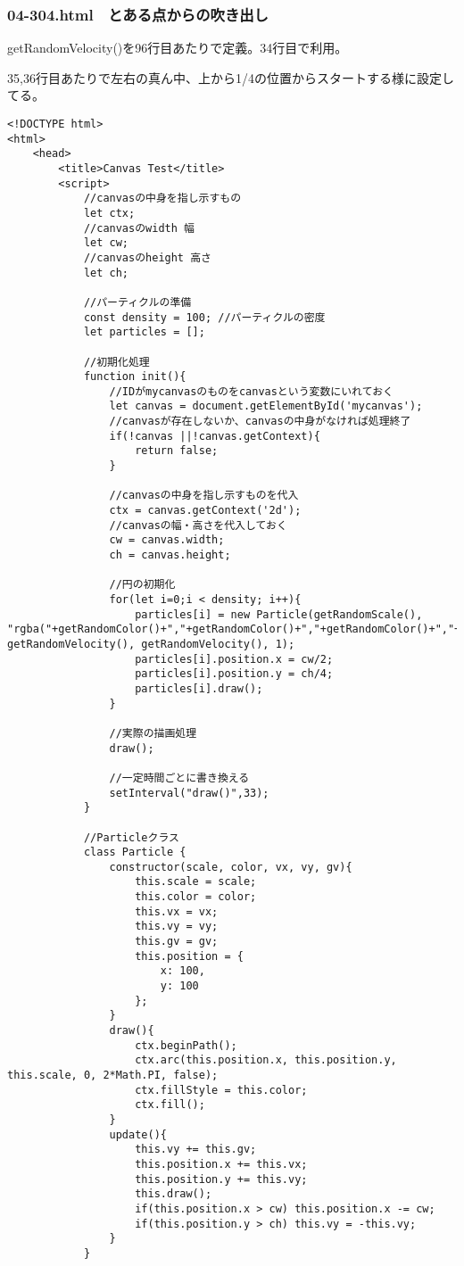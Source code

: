 \documentclass[mingoth,11pt,a4j,uplatex]{jsarticle}
\begin{document}
\subsubsection{04-304.html　とある点からの吹き出し}
getRandomVelocity()を96行目あたりで定義。34行目で利用。

35,36行目あたりで左右の真ん中、上から1/4の位置からスタートする様に設定してる。

\begin{lstlisting}[caption=とある点からの吹き出し]
<!DOCTYPE html>
<html>
	<head>
		<title>Canvas Test</title>
		<script>
			//canvasの中身を指し示すもの
			let ctx;
			//canvasのwidth 幅
			let cw;
			//canvasのheight 高さ
			let ch;
			
			//パーティクルの準備
			const density = 100; //パーティクルの密度
			let particles = [];
			
			//初期化処理
			function init(){
				//IDがmycanvasのものをcanvasという変数にいれておく
				let canvas = document.getElementById('mycanvas');
				//canvasが存在しないか、canvasの中身がなければ処理終了
				if(!canvas ||!canvas.getContext){
					return false;
				}
				
				//canvasの中身を指し示すものを代入
				ctx = canvas.getContext('2d');
				//canvasの幅・高さを代入しておく
				cw = canvas.width;
				ch = canvas.height;
				
				//円の初期化
				for(let i=0;i < density; i++){
					particles[i] = new Particle(getRandomScale(), "rgba("+getRandomColor()+","+getRandomColor()+","+getRandomColor()+","+getRandomAlpha()+")", getRandomVelocity(), getRandomVelocity(), 1);
					particles[i].position.x = cw/2;
					particles[i].position.y = ch/4;
					particles[i].draw();			
				}
				
				//実際の描画処理
				draw();
				
				//一定時間ごとに書き換える
				setInterval("draw()",33);
			}
			
			//Particleクラス
			class Particle {
				constructor(scale, color, vx, vy, gv){
					this.scale = scale;
					this.color = color;
					this.vx = vx;
					this.vy = vy;
					this.gv = gv;
					this.position = {
						x: 100,
						y: 100
					};
				}
				draw(){
					ctx.beginPath();
					ctx.arc(this.position.x, this.position.y, this.scale, 0, 2*Math.PI, false);
					ctx.fillStyle = this.color;
					ctx.fill();
				}
				update(){
					this.vy += this.gv;
					this.position.x += this.vx;
					this.position.y += this.vy;
					this.draw();
					if(this.position.x > cw) this.position.x -= cw;
					if(this.position.y > ch) this.vy = -this.vy;
				}
			}
			

\end{lstlisting}
\end{document}
